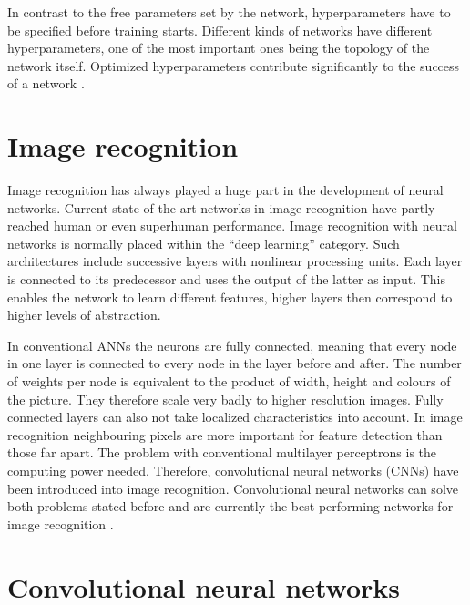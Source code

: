 In contrast to the free parameters set by the network, hyperparameters have to be specified before training starts. Different kinds of networks have different hyperparameters, one of the most important ones being the topology of the network itself. Optimized hyperparameters contribute significantly to the success of a network \cite{Bishop2016}.


\section{Image recognition}
Image recognition has always played a huge part in the development of neural networks. Current state-of-the-art networks in image recognition have partly reached human or even superhuman performance. Image recognition with neural networks is normally placed within the \enquote{deep learning} category. Such architectures include successive layers with nonlinear processing units. Each layer is connected to its predecessor and uses the output of the latter as input. This enables the network to learn different features, higher layers then correspond to higher levels of abstraction. 

In conventional ANNs the neurons are fully connected, meaning that every node in one layer is connected to every node in the layer before and after. The number of weights per node is equivalent to the product of width, height and colours of the picture. They therefore scale very badly to higher resolution images. Fully connected layers can also not take localized characteristics into account. In image recognition neighbouring pixels are more important for feature detection than those far apart.
The problem with conventional multilayer perceptrons is the computing power needed. Therefore, convolutional neural networks (CNNs) have been introduced into image recognition.
Convolutional neural networks can solve both problems stated before and are currently the best performing networks for image recognition \cite{imagenet}. 



\section{Convolutional neural networks}

